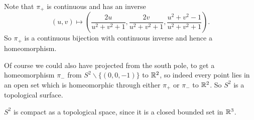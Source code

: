 \documentclass[a4paper]{scrartcl}
\begin{document}
\begin{example}
\begin{center}
    \end{center}

    Note that $\pi_{+}$ is continuous and has an inverse
    $$
    (u, v) \mapsto \left(\frac{2u}{u^2 + v^2 + 1}, \frac{2v}{u^2 + v^2 + 1}, \frac{u^2 + v^2 - 1}{u^2 + v^2 + 1}\right).
    $$
    So $\pi_+$ is a continuous bijection with continuous inverse and hence a homeomorphism.

    Of course we could also have projected from the south pole, to get a homeomorphism $\pi_-$ from $S^2 \backslash \{(0, 0, -1)\}$ to $\mathbb{R}^2$, so indeed every point lies in an open set which is homeomorphic through either $\pi_+$ or $\pi_-$ to $\mathbb{R}^2$. So $S^2$ is a topological surface.
\end{example}

\begin{remark}
    $S^2$ is compact as a topological space, since it is a closed bounded set in $\mathbb{R}^3$.
\end{remark}
\end{document}
